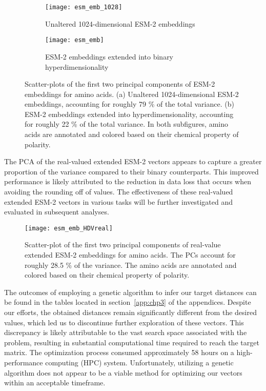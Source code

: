 \begin{figure}[H]
\centering
\begin{subfigure}[b]{0.4\textwidth}
    \texttt{[image: esm\_emb\_1028]}
    \caption{Unaltered 1024-dimensional ESM-2 embeddings}
    \label{fig:AAesm_pure}
\end{subfigure}
    \hspace{1cm}
\begin{subfigure}[b]{0.4\textwidth}
    \texttt{[image: esm\_emb]}
    \caption{ESM-2 embeddings extended into binary hyperdimensionality}
    \label{fig:AAesm}
\end{subfigure}
\caption{Scatter-plots of the first two principal components of ESM-2 embeddings for amino acids. (a) Unaltered 1024-dimensional ESM-2 embeddings, accounting for roughly 79 \% of the total variance. (b) ESM-2 embeddings extended into hyperdimensionality, accounting for roughly 22 \% of the total variance. In both subfigures, amino acids are annotated and colored based on their chemical property of polarity.}
\label{fig:combined_ESM_embeddings}
\end{figure}

The PCA of the real-valued extended ESM-2 vectors appears to capture a greater proportion of the variance compared to their binary counterparts. This improved performance is likely attributed to the reduction in data loss that occurs when avoiding the rounding off of values. The effectiveness of these real-valued extended ESM-2 vectors in various tasks will be further investigated and evaluated in subsequent analyses.

\begin{figure}[H]
    \centering
    \texttt{[image: esm\_emb\_HDVreal]}
\caption{Scatter-plot of the first two principal components of real-value extended ESM-2 embeddings for amino acids. The PCs account for roughly 28.5 \% of the variance. The amino acids are annotated and colored based on their chemical property of polarity.}
\label{fig:AAesmreal}
\end{figure}

The outcomes of employing a genetic algorithm to infer our target distances can be found in the tables located in section~\ref{app:chp3} of the appendices. Despite our efforts, the obtained distances remain significantly different from the desired values, which led us to discontinue further exploration of these vectors. This discrepancy is likely attributable to the vast search space associated with the problem, resulting in substantial computational time required to reach the target matrix. The optimization process consumed approximately 58 hours on a high-performance computing (HPC) system. Unfortunately, utilizing a genetic algorithm does not appear to be a viable method for optimizing our vectors within an acceptable timeframe.

